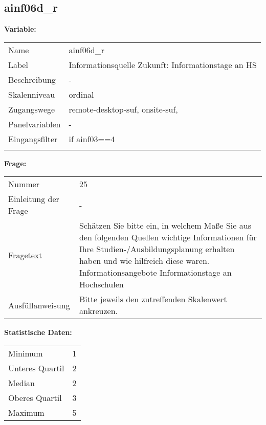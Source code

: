 	
	
	\subsection{ainf06d\_r}
	\label{subSection:ainf06d_r}

	\noindent\textbf{Variable:}\\
		\begin{tabular}{lL{11.3cm}}
			\label{tableVariable:ainf06d_r}
			Name & ainf06d\_r \\
			Label & Informationsquelle Zukunft: Informationstage an HS \\
			Beschreibung & - \\
			Skalenniveau & ordinal \\
			Zugangswege &
				remote-desktop-suf,
				onsite-suf,
 \\
			Panelvariablen & -
			 \\
			Eingangsfilter & if ainf03==4 \\
 \\
		\end{tabular}

		\vspace*{1 cm}
		\noindent\textbf{Frage:}\\
		\begin{tabular}{lL{11.3cm}}
			\label{tableQuestion:ainf06d_r}
			Nummer & 25 \\
			Einleitung der Frage & - \\
			Fragetext & Schätzen Sie bitte ein, in welchem Maße Sie aus den folgenden Quellen wichtige Informationen für Ihre Studien-/Ausbildungsplanung erhalten haben und wie hilfreich diese waren.
Informationsangebote
Informationstage an Hochschulen \\
			Ausfüllanweisung & Bitte jeweils den zutreffenden Skalenwert ankreuzen. \\
		\end{tabular}


		\vspace*{1 cm}
		\noindent\textbf{Statistische Daten:}\\
			\begin{tabular}{ll}
				\label{tableStatistics:ainf06d_r}
					Minimum & 1 \\
					Unteres Quartil & 2 \\
					Median & 2 \\
					Oberes Quartil & 3 \\
					Maximum & 5 \\
			\end{tabular}



